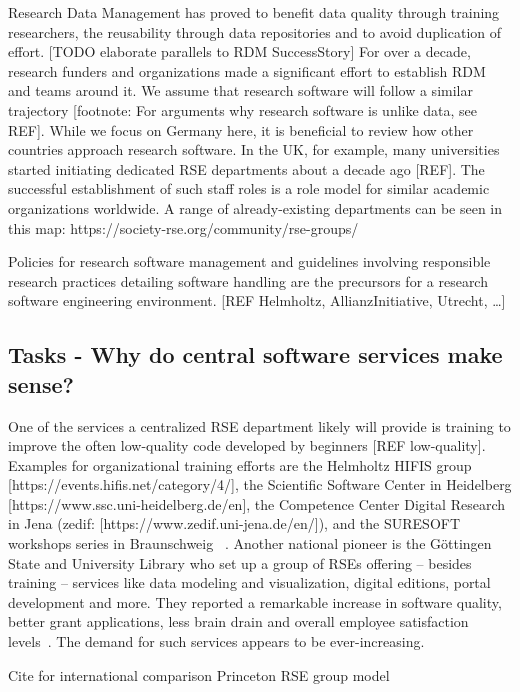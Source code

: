 \documentclass{article}
\begin{document}
Research Data Management has proved to benefit data quality through training researchers, the reusability through data repositories and to avoid duplication of effort.
[TODO elaborate parallels to RDM SuccessStory] For over a decade, research funders and organizations made a significant effort to establish RDM and teams around it.
We assume that research software will follow a similar trajectory [footnote: For arguments why research software is unlike data, see REF].
While we focus on Germany here, it is beneficial to review how other countries approach research software.
In the UK, for example, many universities started initiating dedicated RSE departments about a decade ago [REF].
The successful establishment of such staff roles is a role model for similar academic organizations worldwide.
A range of already-existing departments can be seen in this map: https://society-rse.org/community/rse-groups/ 

Policies for research software management and guidelines involving responsible research practices detailing software handling are the precursors for a research software engineering environment. [REF Helmholtz, AllianzInitiative, Utrecht, …]

\subsection{Tasks - Why do central software services make sense?}

One of the services a centralized RSE department likely will provide is training to improve the often low-quality code developed by beginners [REF low-quality].
Examples for organizational training efforts are the Helmholtz HIFIS group [https://events.hifis.net/category/4/], the Scientific Software Center in Heidelberg [https://www.ssc.uni-heidelberg.de/en], the Competence Center Digital Research in Jena (zedif: [https://www.zedif.uni-jena.de/en/]), and the SURESOFT workshops series in Braunschweig ~\autocite{SURESOFTLink}.
Another national pioneer is the Göttingen State and University Library who set up a group of RSEs offering – besides training – services like data modeling and visualization, digital editions, portal development and more. They reported a remarkable increase in software quality, better grant applications, less brain drain and overall employee satisfaction levels~\autocite{schimavoigt2023}.
The demand for such services appears to be ever-increasing.

Cite for international comparison \autocite{Cosden2022} Princeton RSE group model
\end{document}
